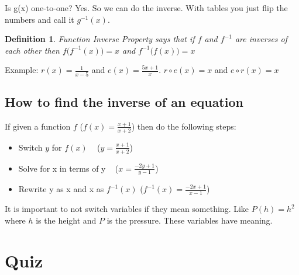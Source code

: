 \documentclass{tufte-handout}
\newtheorem{mydef}{Definition}
\begin{document}
Is g(x) one-to-one? Yes.  So we can do the inverse.  With tables you just flip the numbers and call it $g^{-1}(x)$.

\begin{mydef}
Function Inverse Property says that if $f$ and $f^{-1}$ are inverses of each other then $f \big ( f^{-1} (x) \big ) = x$ and $ f^{-1} \big ( f (x) \big ) = x$
\end{mydef}

\noindent Example: $r(x) = \frac{1}{x-5}$ and $e(x) = \frac{5x + 1}{x}$. $r \circ e (x) = x$ and $e \circ r (x) = x$

\subsection{How to find the inverse of an equation}

If given a function $f$ ($f(x) = \frac{x+1}{x+2}$) then do the following steps:
\begin{itemize}
\item Switch $y$ for $f(x)$ ~ ($y = \frac{x+1}{x+2}$)
\item Solve for x in terms of y ~ ($x = \frac{-2y + 1}{y -1}$)
\item Rewrite y as x and x as $f^{-1}(x)$ ($f^{-1}(x) = \frac{-2x + 1}{x -1}$)
\end{itemize}
It is important to not switch variables if they mean something. Like $P(h) = h^2$ where $h$ is the height and $P$ is the pressure.  These variables have meaning.

\section{Quiz}
\end{document}

